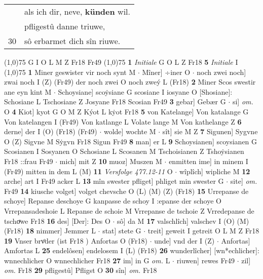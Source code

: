 \documentclass[8pt,a4paper,notitlepage]{article}
\begin{document}
\begin{table}[ht]
\begin{minipage}[t]{0.5\linewidth}
\begin{tabular}{rl}
 & als ich dir, neve, \textbf{künden} wil.\\ 
 & pfligestû danne triuwe,\\ 
30 & sô erbarmet dich sîn riuwe.\\ 
\end{tabular}
\scriptsize
\line(1,0){75} \newline
G I O L M Z Fr18 Fr49 \newline
\line(1,0){75} \newline
\textbf{1} \textit{Initiale} G O L Z Fr18  \textbf{5} \textit{Initiale} I  \newline
\line(1,0){75} \newline
\textbf{1} Miner geswister vir noch synt M  $\cdot$ Mîner] ÷iner O  $\cdot$ noch zwei noch] zwai noch I (Z) (Fr49) der noch zwei O noch zweý L (Fr18) \textbf{2} Miner Scos swestir ane eyn kint M  $\cdot$ Schoysiane] scoẏsiane G scosiane I iosyane O [Shosiane]: Schosiane L Tschosiane Z Josyane Fr18 Scosian Fr49 \textbf{3} gebar] Gebær G  $\cdot$ si] \textit{om.} O \textbf{4} Kiot] kyot G O M Z Kýot L kẏot Fr18 \textbf{5} von Katelange] Von katalange G Von katelangen I (Fr49) Von katlange L Volate lange M Von kathelange Z \textbf{6} derne] der I (O) (Fr18) (Fr49)  $\cdot$ wolde] wochte M  $\cdot$ sît] sie M Z \textbf{7} Sigunen] Sygvne O (Z) Sigvne M Sẏgvn Fr18 Sigun Fr49 \textbf{8} man] er L \textbf{9} Schoysianen] scoysianen G Scosianen I Sosyanen O Schosiane L Scosanen M Tschoisianen Z Tshoẏsianen Fr18 ::frau Fr49  $\cdot$ mich] mit Z \textbf{10} muoz] Muszen M  $\cdot$ enmitten ime] in minem I (Fr49) mitten in dem L (M) \textbf{11} \textit{Versfolge 477.12-11} O   $\cdot$ wîplîch] wipliche M \textbf{12} arche] art I Fr49 acker L \textbf{13} mîn swester pfliget] phliget min swester G  $\cdot$ site] \textit{om.} Fr49 \textbf{14} kiusche volget] volget chevsche O (L) (M) (Z) (Fr18) \textbf{15} Urrepanse de schoye] Repanse deschoye G kanpasse de schoy I :epanse der schoye O Vrrepansadeshoie L Repanse de schoie M Vrrepanse de tschoie Z Vrredepanse de tschoͮwe Fr18 \textbf{16} des] [Der]: Des O  $\cdot$ sô] da M \textbf{17} valschlîch] valschev I (O) (M) (Fr18) \textbf{18} nimmer] Jemmer L  $\cdot$ stat] stete G  $\cdot$ treit] geweit I getreit O L M Z Fr18 \textbf{19} Vnser brvͦder (ist Fr18 ) Anfortas O (Fr18)  $\cdot$ unde] vnd der I (Z)  $\cdot$ Anfortas] Amfortas L \textbf{25} endelôsen] endelosem I (L) (Fr18) \textbf{26} wunderlîcher] [wn*echlicher]: wnnechlicher O wnnechlicher Fr18 \textbf{27} im] in G \textit{om.} L  $\cdot$ riuwen] rewes Fr49  $\cdot$ zil] \textit{om.} Fr18 \textbf{29} pfligestû] Pfligst O \textbf{30} sîn] \textit{om.} Fr18 \newline

\end{minipage}
\end{table}
\end{document}
